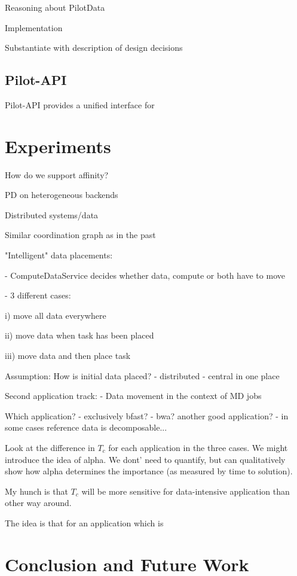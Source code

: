\documentclass[conference]{IEEEtran}
\begin{document}
Reasoning about PilotData

Implementation

Substantiate with description of design decisions

\subsection{Pilot-API}
Pilot-API provides a unified interface for 







\section{Experiments}

How do we support affinity?

PD on heterogeneous backends

Distributed systems/data

Similar coordination graph as in the past

"Intelligent" data placements:

- ComputeDataService decides whether data, compute or both have to move

- 3 different cases:

i) move all data everywhere

ii) move data when task has been placed

iii) move data and then place task

Assumption:
How is initial data placed?
- distributed
- central in one place

Second application track:
- Data movement in the context of MD jobs

Which application?
- exclusively bfast?
- bwa? another good application?
- in some cases reference data is decomposable...

Look at the difference in $T_c$ for each application in the three
cases. We might introduce the idea of alpha. We dont' need to
quantify, but can qualitatively show how alpha determines the
importance (as measured by time to solution). 

My hunch is that $T_c$ will be more sensitive for data-intensive
application than other way around.

The idea is that for an application which is



\section{Conclusion and Future Work}
\end{document}
